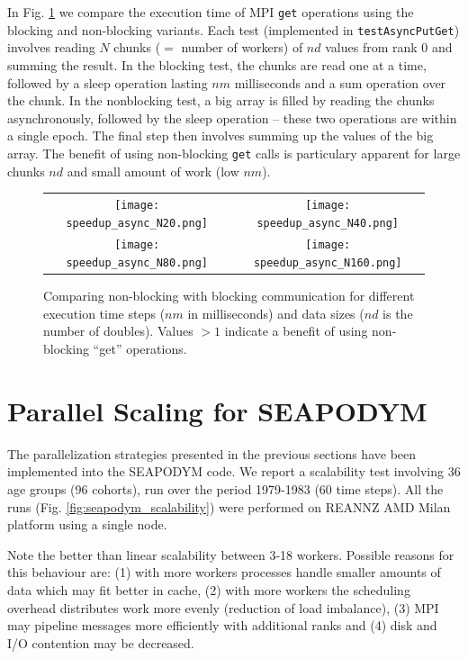 \documentclass[a4paper,oneside,12pt]{article}
\begin{document}
In Fig. \ref{fig:async} we compare the  execution time of MPI \verb|get| operations using 
the blocking and non-blocking variants. Each test (implemented in \verb|testAsyncPutGet|) involves reading $N$ chunks ($=$ number of workers) 
of $nd$ values from rank 0 and summing the result. In the blocking test, the chunks are read one at a 
time, followed by a sleep operation lasting $nm$ milliseconds and a sum operation over the chunk. 
In the nonblocking test, a big array is filled by reading the chunks asynchronously, followed by the 
sleep operation -- these two operations are within a single epoch. The final step then involves summing up the values
of the big array. The benefit of using non-blocking \verb|get| calls is particulary apparent for large chunks 
$nd$ and small amount of work (low $nm$).

\begin{figure}
\begin{tabular}{cc}
      \texttt{[image: speedup\_async\_N20.png]} & \texttt{[image: speedup\_async\_N40.png]} \\
      \texttt{[image: speedup\_async\_N80.png]} & \texttt{[image: speedup\_async\_N160.png]} \\
\end{tabular}
\caption{Comparing non-blocking with blocking communication for different execution time steps ($nm$ in milliseconds) 
and data sizes ($nd$ is the number of doubles). Values $> 1$ indicate a benefit of using non-blocking ``get'' operations.}
\label{fig:async}
\end{figure}

\section{Parallel Scaling for SEAPODYM}

The parallelization strategies presented in the previous sections have been implemented into the SEAPODYM code. 
We report a scalability test involving 36 age groups (96 cohorts), run over the period 1979-1983 (60 time steps). 
All the runs (Fig. \ref{fig:seapodym_scalability}) were performed on REANNZ AMD Milan
platform using a single node. 

Note the better than linear scalability between 3-18 workers. Possible reasons for this behaviour are:
(1) with more workers processes handle smaller amounts of data which may fit better in cache, (2) with more workers the 
scheduling overhead distributes work more evenly (reduction of load imbalance), (3) MPI may pipeline messages more efficiently with 
additional ranks and (4) disk and I/O contention may be decreased.
\end{document}
